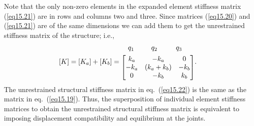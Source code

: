 \documentclass{AeroStructure-ERJohnson}
\begin{document}
Note that the only non-zero elements in the expanded element stiffness matrix (\ref{eq15.21}) are in rows and columns two and three. Since matrices (\ref{eq15.20}) and (\ref{eq15.21}) are of the same dimensions we can add them to get the unrestrained stiffness matrix of the structure; i.e.,
\begin{align}\label{eq15.22}
[K]=\left[K_{a}\right]+\left[K_{b}\right]=
\begin{array}{@{}l@{}}
{\begin{array}{@{}l@{}}\hspace*{10pt}  q_{1} \hspace*{25pt} q_{2} \hspace*{27pt} q_{3} \end{array}}\\[4pt]
\left[\begin{array}{@{}ccc@{}}
k_{a} & -k_{a} & 0 \\
-k_{a} &(k_{a}+k_{b}) & -k_{b} \\
0 & -k_{b} & k_{b}
\end{array}\right]
\end{array}.
\end{align}
The unrestrained structural stiffness matrix in eq.~(\ref{eq15.22}) is the same as the matrix in eq.~(\ref{eq15.19}). Thus, the superposition of individual element stiffness matrices to obtain the unrestrained structural stiffness matrix is equivalent to imposing displacement compatibility and equilibrium at the joints.
\end{document}
